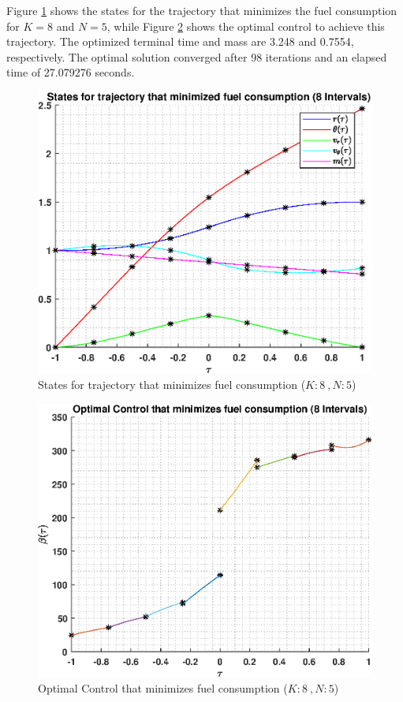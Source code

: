 \documentclass[]{article}
\begin{document}
Figure \ref{fig:directStatesK8Poly5} shows the states for the trajectory that minimizes the fuel consumption for \(K = 8\) and  \(N = 5\), while Figure \ref{fig:directControlK8Poly5} shows the optimal control to achieve this trajectory. The optimized terminal time and mass are 3.248 and 0.7554, respectively. The optimal solution converged after 98 iterations and an elapsed time of 27.079276 seconds.
\begin{figure}
	\centering
	\includegraphics[scale=0.75]{directStatesK8Poly5.eps}
	\caption{States for trajectory that minimizes fuel consumption (\(K:8\ , N:5\))}
	\label{fig:directStatesK8Poly5}
\end{figure}
\begin{figure}
	\centering
	\includegraphics[scale=0.75]{directControlK8Poly5.eps}
	\caption{Optimal Control that minimizes fuel consumption (\(K:8\ , N:5\))}
	\label{fig:directControlK8Poly5}
\end{figure}
\FloatBarrier
\end{document}
